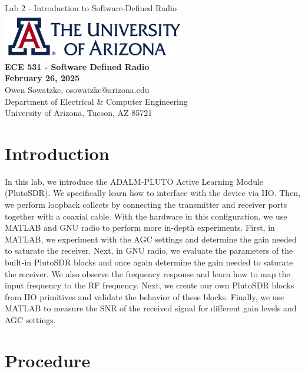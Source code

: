 \documentclass{article}
\begin{document}
\begin{titlepage}
	\centering
	{\huge Lab 2 - Introduction to Software-Defined Radio}\\[0.25 in]
	\includegraphics[width=0.6\textwidth]{ua_logo.png}\\[0.25 in]
	{\large \textbf{ECE 531 - Software Defined Radio\\[0.25 in]
	February 26, 2025\\[0.25 in]}}
	{\large Owen Sowatzke, osowatzke@arizona.edu\\[0.05 in]
	Department of Electrical \& Computer Engineering\\[0.05 in]
	University of Arizona, Tucson, AZ 85721\\[0.5 in]}
	\hypersetup{linkcolor=navy-blue}
	\noindent\hrulefill
	\tableofcontents
	\noindent\hrulefill
\end{titlepage}

\setlength{\parindent}{0pt}

\section{Introduction}

In this lab, we introduce the ADALM-PLUTO Active Learning Module (PlutoSDR). We specifically learn how to interface with the device via IIO. Then, we perform loopback collects by connecting the transmitter and receiver ports together with a coaxial cable. With the hardware in this configuration, we use MATLAB and GNU radio to perform more in-depth experiments. First, in MATLAB, we experiment with the AGC settings and determine the gain needed to saturate the receiver. Next, in GNU radio, we evaluate the parameters of the built-in PlutoSDR blocks and once again determine the gain needed to saturate the receiver. We also observe the frequency response and learn how to map the input frequency to the RF frequency. Next, we create our own PlutoSDR blocks from IIO primitives and validate the behavior of these blocks. Finally, we use MATLAB to measure the SNR of the received signal for different gain levels and AGC settings. 

\section{Procedure}
\end{document}
